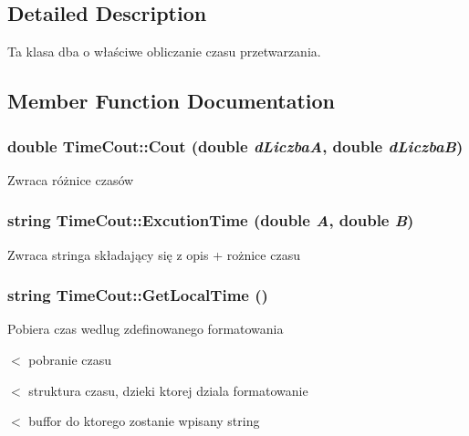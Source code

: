 \subsection{Detailed Description}
Ta klasa dba o właściwe obliczanie czasu przetwarzania. 

\subsection{Member Function Documentation}
\hypertarget{classTimeCout_ac8c0cffeea3afdc63d2d9cb86320c89f}{
\subsubsection[{Cout}]{\setlength{\rightskip}{0pt plus 5cm}double TimeCout::Cout (double {\em dLiczbaA}, \/  double {\em dLiczbaB})}}
\label{classTimeCout_ac8c0cffeea3afdc63d2d9cb86320c89f}


Zwraca różnice czasów 

\hypertarget{classTimeCout_a6ed7a20e4510642d6ffdf1cdbffd2b9f}{
\subsubsection[{ExcutionTime}]{\setlength{\rightskip}{0pt plus 5cm}string TimeCout::ExcutionTime (double {\em A}, \/  double {\em B})}}
\label{classTimeCout_a6ed7a20e4510642d6ffdf1cdbffd2b9f}


Zwraca stringa składający się z opis + rożnice czasu 

\hypertarget{classTimeCout_a343b4ea828779afff35c01bbfc4fa506}{
\subsubsection[{GetLocalTime}]{\setlength{\rightskip}{0pt plus 5cm}string TimeCout::GetLocalTime ()}}
\label{classTimeCout_a343b4ea828779afff35c01bbfc4fa506}


Pobiera czas wedlug zdefinowanego formatowania

$<$ pobranie czasu

$<$ struktura czasu, dzieki ktorej dziala formatowanie

$<$ buffor do ktorego zostanie wpisany string 

